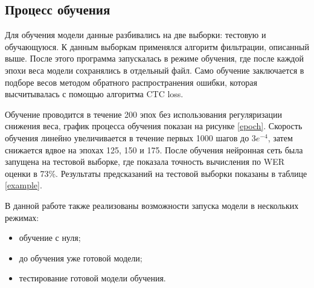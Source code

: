 \subsection{Процесс обучения}

Для обучения модели данные разбивались на две выборки: тестовую и обучающуюся. К данным выборкам применялся алгоритм фильтрации, описанный выше. После этого программа запускалась в режиме обучения, где после каждой эпохи веса модели сохранялись в отдельный файл. Само обучение заключается в подборе весов методом обратного распространения ошибки, которая высчитывалась с помощью алгоритма CTC loss.

Обучение проводится в течение 200 эпох без использования регуляризации снижения веса, график процесса обучения показан на рисунке \ref{epoch}. Скорость обучения линейно увеличивается в течение первых 1000 шагов до $3e^{-4}$, затем снижается вдвое на эпохах 125, 150 и 175. После обучения нейронная сеть была запущена на тестовой выборке, где показала точность вычисления по WER оценки в 73\%. Результаты предсказаний на тестовой выборки показаны в таблице \ref{example}.

В данной работе также реализованы возможности запуска модели в неско\-льких режимах:

\vspace{0.5em-\topsep}
\begin{itemize}
    \item обучение с нуля;
    \item до обучения уже готовой модели;
    \item тестирование готовой модели обучения.
\end{itemize}

